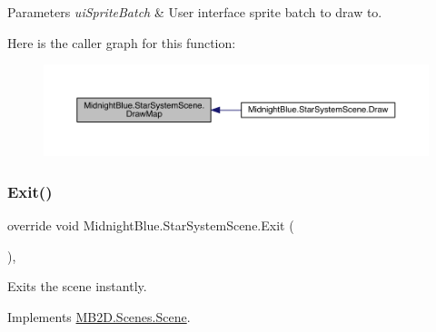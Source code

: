 \begin{DoxyParams}{Parameters}
{\em ui\+Sprite\+Batch} & User interface sprite batch to draw to.\\
\hline
\end{DoxyParams}
Here is the caller graph for this function\+:\nopagebreak
\begin{figure}[H]
\begin{center}
\leavevmode
\includegraphics[width=350pt]{class_midnight_blue_1_1_star_system_scene_a8ce5e552f65d43e0326644e069dc6c24_icgraph}
\end{center}
\end{figure}
\hypertarget{class_midnight_blue_1_1_star_system_scene_ad533ba93e597964d015099031a85cb77}{}\label{class_midnight_blue_1_1_star_system_scene_ad533ba93e597964d015099031a85cb77} 
\subsubsection{\texorpdfstring{Exit()}{Exit()}}
{\footnotesize\ttfamily override void Midnight\+Blue.\+Star\+System\+Scene.\+Exit (\begin{DoxyParamCaption}{ }\end{DoxyParamCaption})\hspace{0.3cm}{\ttfamily [inline]}, {\ttfamily [virtual]}}



Exits the scene instantly. 



Implements \hyperlink{class_m_b2_d_1_1_scenes_1_1_scene_a099b79e16d23b67349847999d2336813}{M\+B2\+D.\+Scenes.\+Scene}.

\hypertarget{class_midnight_blue_1_1_star_system_scene_a9fd64901322082a4da8658650257163d}{}\label{class_midnight_blue_1_1_star_system_scene_a9fd64901322082a4da8658650257163d} 
